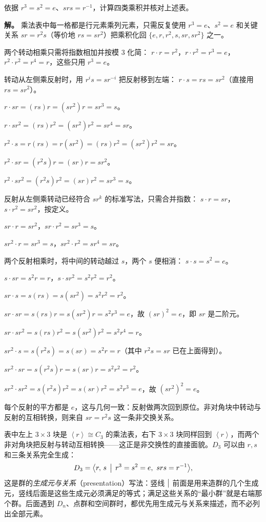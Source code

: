 \begin{example}
依据 $r^3=s^2=e$、$srs=r^{-1}$，计算四类乘积并核对上述表。

\textbf{解。} 乘法表中每一格都是行元素乘列元素，只需反复使用 $r^3=e$、$s^2=e$ 和关键关系 $sr=r^2s$（等价地 $rs=sr^2$）把乘积化回 $\{e,r,r^2,s,sr,sr^2\}$ 之一。

两个转动相乘只需将指数相加并按模 $3$ 化简：
$r\cdot r=r^2$，$r\cdot r^2=r^3=e$，$r^2\cdot r^2=r^4=r$，这些只用 $r^3=e$。

转动从左侧乘反射时，用 $r^is=sr^{-i}$ 把反射移到左端：
$r\cdot s=rs=sr^2$（直接用 $rs=sr^2$）。

$r\cdot sr=(rs)r=(sr^2)r=sr^3=s$。

$r\cdot sr^2=(rs)r^2=(sr^2)r^2=sr^4=sr$。

$r^2\cdot s=r(rs)=r(sr^2)=(rs)r^2=(sr^2)r^2=sr$。

$r^2\cdot sr=(r^2s)r=(sr)r=sr^2$。

$r^2\cdot sr^2=(r^2s)r^2=(sr)r^2=sr^3=s$。

反射从左侧乘转动已经符合 $sr^k$ 的标准写法，只需合并指数：
$s\cdot r=sr$，$s\cdot r^2=sr^2$，按定义。

$sr\cdot r=sr^2$，$sr\cdot r^2=sr^3=s$。

$sr^2\cdot r=sr^3=s$，$sr^2\cdot r^2=sr^4=sr$。

两个反射相乘时，将中间的转动越过 $s$，两个 $s$ 便相消：
$s\cdot s=s^2=e$。

$s\cdot sr=s^2r=r$，$s\cdot sr^2=s^2r^2=r^2$。

$sr\cdot s=s(rs)=s(sr^2)=s^2r^2=r^2$。

$sr\cdot sr=s(rs)r=s(sr^2)r=s^2r^3=e$，故 $(sr)^2=e$，即 $sr$ 是二阶元。

$sr\cdot sr^2=s(rs)r^2=s(sr^2)r^2=s^2r^4=r$。

$sr^2\cdot s=s(r^2s)=s(sr)=s^2r=r$（其中 $r^2s=sr$ 已在上面得到）。

$sr^2\cdot sr=s(r^2s)r=s(sr)r=s^2r^2=r^2$。

$sr^2\cdot sr^2=s(r^2s)r^2=s(sr)r^2=s^2r^3=e$，故 $(sr^2)^2=e$。

每个反射的平方都是 $e$，这与几何一致：反射做两次回到原位。非对角块中转动与反射的互相转换，则来自 $sr=r^2s$ 这一条非交换关系。
\end{example}
表中左上 $3\times3$ 块是 $\left\langle r\right\rangle\cong C_3$ 的乘法表，右下 $3\times3$ 块同样回到 $\left\langle r\right\rangle$，而两个非对角块把反射与转动互相转换——这正是非交换性的直接面貌。$D_3$ 可以由 $r,s$ 和三条关系完全生成：
\[
D_3=\bigl\langle r,\,s\,\bigm|\, r^3=s^2=e,\ srs=r^{-1}\bigr\rangle,
\]
这是群的\emph{生成元与关系}（presentation）写法：竖线 $\bigm|$ 前面是用来造群的几个生成元，竖线后面是这些生成元必须满足的等式；满足这些关系的“最小群”就是右端那个群。后面遇到 $D_n$、点群和空间群时，都优先用生成元与关系来描述，而不必列出全部元素。

